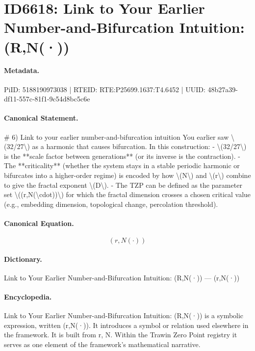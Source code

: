 \section*{ID6618: Link to Your Earlier Number-and-Bifurcation Intuition: (R,N(·))}
\paragraph{Metadata.}
PiID: 5188190973038 | RTEID: RTE:P25699.1637:T4.6452 | UUID: 48b27a39-df11-557c-81f1-9c54d8bc5c6e

\paragraph{Canonical Statement.}
\# 6) Link to your earlier number-and-bifurcation intuition You earlier saw \textbackslash{}(32/27\textbackslash{}) as a harmonic that causes bifurcation. In this construction: - \textbackslash{}(32/27\textbackslash{}) is the **scale factor between generations** (or its inverse is the contraction). - The **criticality** (whether the system stays in a stable periodic harmonic or bifurcates into a higher-order regime) is encoded by how \textbackslash{}(N\textbackslash{}) and \textbackslash{}(r\textbackslash{}) combine to give the fractal exponent \textbackslash{}(D\textbackslash{}). - The TZP can be defined as the parameter set \textbackslash{}((r,N(\textbackslash{}cdot))\textbackslash{}) for which the fractal dimension crosses a chosen critical value (e.g., embedding dimension, topological change, percolation threshold).

\paragraph{Canonical Equation.}
\[
(r,N(\cdot))
\]

\paragraph{Dictionary.}
Link to Your Earlier Number-and-Bifurcation Intuition: (R,N(·)) — (r,N(·))

\paragraph{Encyclopedia.}
Link to Your Earlier Number-and-Bifurcation Intuition: (R,N(·)) is a symbolic expression, written (r,N(·)). It introduces a symbol or relation used elsewhere in the framework. It is built from r, N. Within the Trawin Zero Point registry it serves as one element of the framework's mathematical narrative.
